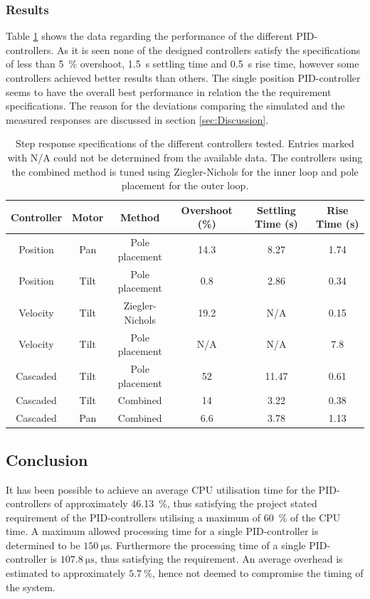 \documentclass[../../main.tex]{subfiles}
\begin{document}
\subsubsection*{Results}
Table \ref{tab:controller_data} shows the data regarding the performance of the different PID-controllers. As it is seen none of the designed controllers satisfy the specifications of less than \SI{5}{\percent} overshoot, \SI{1,5}{\second} settling time and \SI{0,5}{\second} rise time, however some controllers achieved better results than others. The single position PID-controller seems to have the overall best performance in relation the the requirement specifications. The reason for the deviations comparing the simulated and the measured responses are discussed in section \ref{sec:Discussion}.
\begin{table}[H]
    \centering
    \begin{tabular}{c|c|c|c|c|c}
         Controller & Motor & Method & Overshoot (\%) & Settling Time (s)  & Rise Time (s) \\ \hline
         Position & Pan & Pole placement & 14.3 & 8.27 & 1.74  \\
         Position & Tilt & Pole placement & 0.8 & 2.86 & 0.34  \\
         Velocity & Tilt & Ziegler-Nichols & 19.2 & N/A & 0.15  \\
         Velocity &Tilt & Pole placement & N/A & N/A & 7.8 \\
         Cascaded & Tilt  & Pole placement & 52 & 11.47 & 0.61 \\
         Cascaded & Tilt & Combined & 14 & 3.22 & 0.38  \\
         Cascaded & Pan & Combined & 6.6 & 3.78 & 1.13  \\
         
    \end{tabular}
    \caption{Step response specifications of the different controllers tested. Entries marked with N/A could not be determined from the available data. The controllers using the combined method is tuned using Ziegler-Nichols for the inner loop and pole placement for the outer loop.}
    \label{tab:controller_data}
\end{table}

\subsection{Conclusion}
It has been possible to achieve an average CPU utilisation time for the PID-controllers of approximately \SI{46,13}{\percent}, thus satisfying the project stated requirement of the PID-controllers utilising a maximum of \SI{60}{\percent} of the CPU time. A maximum allowed processing time for a single PID-controller is determined to be $\SI{150}{\micro \second}$. Furthermore the processing time of a single PID-controller is $\SI{107,8}{\micro \second}$, thus satisfying the requirement. An average overhead is estimated to approximately $\SI{5,7}{\percent}$, hence not deemed to compromise the timing of the system.
\end{document}

